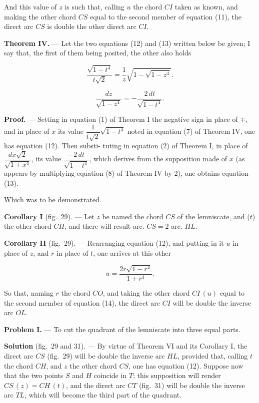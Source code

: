 \documentclass{article}
\begin{document}
And this value of $z$ is such that, calling $u$ the chord $CI$ taken as known, and making the
other chord $CS$ equal to the second member of equation (11), the direct arc $CS$ is double the
other direct arc $CI$.

\textbf{Theorem IV.} --- Let the two equations (12) and (13) written below be given; I say that,
the first of them being posited, the other also holds

\[ \frac{\sqrt{1-t^{4}}}{t\sqrt{2}} = \frac{1}{z}\sqrt{1-\sqrt{1-z^{4}}}. \tag{12} \]

\[ \frac{dz}{\sqrt{1-z^{4}}} = -\frac{2\,dt}{\sqrt{1-t^{4}}}. \tag{13} \]

\textbf{Proof.} --- Setting in equation (1) of Theorem I the negative sign in place of $\mp$, and
in place of $x$ its value $\dfrac{1}{t\sqrt{2}}\sqrt{1-t^{4}}$ noted in equation (7) of Theorem
IV, one has equation (12). Then substi-
tuting in equation (2) of Theorem I, in place of $\dfrac{dx\sqrt{2}}{\sqrt{1+x^{4}}}$, its value
$\dfrac{-2\,dt}{\sqrt{1-t^{4}}}$, which derives from the supposition made of $x$ (as appears by
multiplying equation (8) of Theorem IV by 2), one obtains equation (13).

Which was to be demonstrated.

\textbf{Corollary I} (fig.~29). --- Let $z$ be named the chord $CS$ of the lemniscate, and ($t$)
the other chord $CH$, and there will result arc. $CS = 2$ arc. $HL$.

\textbf{Corollary II} (fig.~29). --- Rearranging equation (12), and putting in it $u$ in place of
$z$, and $r$ in place of $t$, one arrives at this other

\[ u = \frac{2r\sqrt{1-r^{4}}}{1+r^{4}}. \tag{14} \]

So that, naming $r$ the chord $CO$, and taking the other chord $CI\,(u)$ equal to the second
member of equation (14), the direct arc $CI$ will be double the inverse arc $OL$.

\textbf{Problem I.} --- To cut the quadrant of the lemniscate into three equal parts.

\textbf{Solution} (fig.~29 and 31). --- By virtue of Theorem VI and its Corollary I, the direct
arc $CS$ (fig.~29) will be double the inverse arc $HL$, provided that, calling $t$ the chord
$CH$, and $z$ the other chord $CS$, one has equation (12). Suppose now that the two points $S$
and $H$ coincide in $T$; this supposition will render $CS\,(z) = CH\,(t)$, and the direct arc
$CT$ (fig.~31) will be double the inverse arc $TL$, which will become the third part of the
quadrant.
\end{document}
